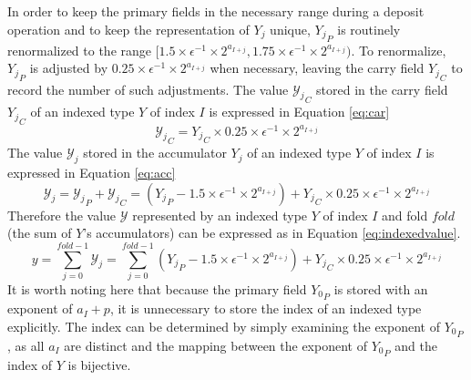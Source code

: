 \documentclass[12pt]{article}
\theoremstyle{plain}
\begin{document}
      In order to keep the primary fields in the necessary range during a deposit operation and to keep the representation of $Y_j$ unique, ${Y_j}_P$ is routinely renormalized to the range $[1.5 \times\epsilon^{-1} \times 2^{a_{I + j}}, 1.75 \times\epsilon^{-1} \times 2^{a_{I + j}})$.
      To renormalize, ${Y_j}_P$ is adjusted by $0.25 \times\epsilon^{-1} \times 2^{a_{I + j}}$ when necessary, leaving the carry field ${Y_j}_C$ to record the number of such adjustments.
      The value ${\mathcal{Y}_j}_C$ stored in the carry field ${Y_j}_C$ of an indexed type $Y$ of index $I$ is expressed in Equation \ref{eq:car}
      \begin{equation}
        {\mathcal{Y}_j}_C = {Y_j}_C \times 0.25\times\epsilon^{-1}\times2^{a_{I + j}}
        \label{eq:car}
      \end{equation}
      The value $\mathcal{Y}_j$ stored in the accumulator $Y_j$ of an indexed type $Y$ of index $I$ is expressed in Equation \ref{eq:acc}
      \begin{equation}
        \mathcal{Y}_j = {\mathcal{Y}_j}_P + {\mathcal{Y}_j}_C = ({Y_j}_P - 1.5 \times\epsilon^{-1}\times 2^{a_{I + j}}) + {Y_j}_C \times 0.25\times\epsilon^{-1}\times2^{a_{I + j}}
        \label{eq:acc}
      \end{equation}
      Therefore the value $\mathcal{Y}$ represented by an indexed type $Y$ of index $I$ and fold $fold$ (the sum of $Y$'s accumulators) can be expressed as in Equation \ref{eq:indexedvalue}.
      \begin{equation}
        y = \sum\limits_{j = 0}^{fold - 1} \mathcal{Y}_j = \sum\limits_{j = 0}^{fold - 1} ({Y_j}_P - 1.5 \times\epsilon^{-1}\times 2^{a_{I + j}}) + {Y_j}_C \times 0.25\times\epsilon^{-1}\times2^{a_{I + j}}
        \label{eq:indexedvalue}
      \end{equation}
      It is worth noting here that because the primary field ${Y_0}_P$ is stored with an exponent of $a_I + p$, it is unnecessary to store the index of an indexed type explicitly. The index can be determined by simply examining the exponent of ${Y_0}_P$, as all $a_I$ are distinct and the mapping between the exponent of ${Y_0}_P$ and the index of $Y$ is bijective.
\end{document}
